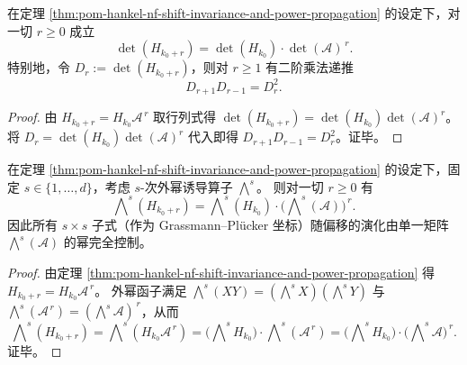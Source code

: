 \begin{corollary}\label{cor:pom-hankel-determinant-geometric-law}
在定理 \ref{thm:pom-hankel-nf-shift-invariance-and-power-propagation} 的设定下，对一切 \(r\ge 0\) 成立
\[
\det(H_{k_0+r})=\det(H_{k_0})\cdot \det(\mathcal A)^{\,r}.
\]
特别地，令 \(D_r:=\det(H_{k_0+r})\)，则对 \(r\ge 1\) 有二阶乘法递推
\[
D_{r+1}D_{r-1}=D_r^2.
\]
\end{corollary}
\begin{proof}
由 \(H_{k_0+r}=H_{k_0}\mathcal A^{\,r}\) 取行列式得
\(
\det(H_{k_0+r})=\det(H_{k_0})\det(\mathcal A)^r
\)。
将 \(D_r=\det(H_{k_0})\det(\mathcal A)^r\) 代入即得 \(D_{r+1}D_{r-1}=D_r^2\)。证毕。
\end{proof}

\begin{theorem}\label{thm:pom-hankel-exterior-power-propagation}
在定理 \ref{thm:pom-hankel-nf-shift-invariance-and-power-propagation} 的设定下，固定 \(s\in\{1,\dots,d\}\)，考虑 \(s\)-次外幂诱导算子 \(\bigwedge^s\)。
则对一切 \(r\ge 0\) 有
\[
\bigwedge\nolimits^s(H_{k_0+r})
=\bigwedge\nolimits^s(H_{k_0})\cdot \bigl(\bigwedge\nolimits^s(\mathcal A)\bigr)^{\,r}.
\]
因此所有 \(s\times s\) 子式（作为 Grassmann--Pl\"ucker 坐标）随偏移的演化由单一矩阵 \(\bigwedge^s(\mathcal A)\) 的幂完全控制。
\end{theorem}
\begin{proof}
由定理 \ref{thm:pom-hankel-nf-shift-invariance-and-power-propagation} 得 \(H_{k_0+r}=H_{k_0}\mathcal A^{\,r}\)。
外幂函子满足 \(\bigwedge^s(XY)=(\bigwedge^sX)(\bigwedge^sY)\) 与 \(\bigwedge^s(\mathcal A^{\,r})=(\bigwedge^s\mathcal A)^{\,r}\)，从而
\[
\bigwedge\nolimits^s(H_{k_0+r})
=\bigwedge\nolimits^s(H_{k_0}\mathcal A^{\,r})
=\bigl(\bigwedge\nolimits^s H_{k_0}\bigr)\cdot \bigwedge\nolimits^s(\mathcal A^{\,r})
=\bigl(\bigwedge\nolimits^s H_{k_0}\bigr)\cdot \bigl(\bigwedge\nolimits^s\mathcal A\bigr)^{\,r}.
\]
证毕。
\end{proof}

